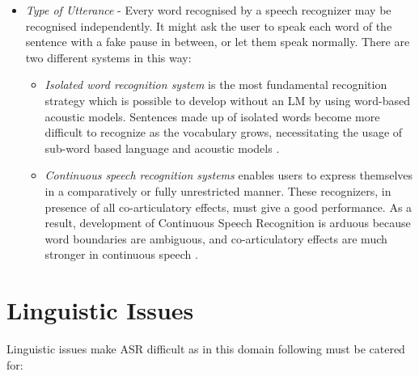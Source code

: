 \begin{itemize}
    \item \textit{Type of Utterance} -  Every word recognised by a speech recognizer may be recognised independently. It might ask the user to speak each word of the sentence with a fake pause in between, or let them speak normally. There are two different systems in this way:
    \begin{itemize}
        \item \textit{Isolated word recognition system} is the most fundamental recognition strategy which is possible to develop without an LM by using word-based acoustic models. Sentences made up of isolated words become more difficult to recognize as the vocabulary grows, necessitating the usage of sub-word based language and acoustic models \cite{backstrom_introduction_2022}.
        \item \textit{Continuous speech recognition systems} enables users to express themselves in a comparatively or fully unrestricted manner. These recognizers, in presence of all co-articulatory effects, must give a good performance. As a result, development of Continuous Speech Recognition is arduous because word boundaries are ambiguous, and co-articulatory effects are much stronger in continuous speech \cite{markus_forsberg_why_2003}.
    \end{itemize}
   
\end{itemize}

\section{Linguistic Issues}
\label{sub:linguistic-issues-asr}
Linguistic issues make ASR difficult as in this domain following must be catered for:


